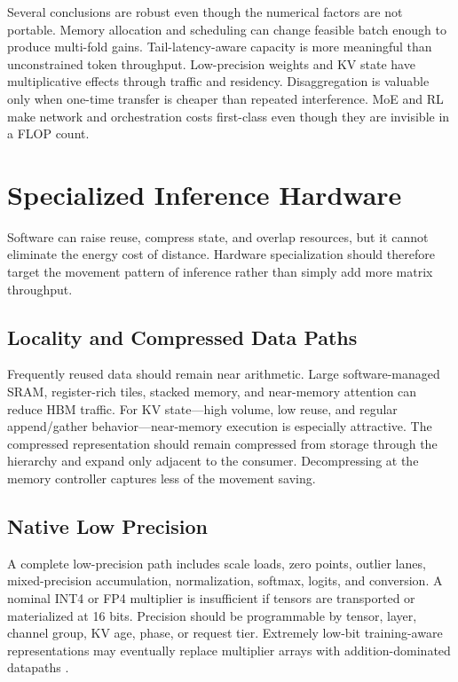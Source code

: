 \documentclass[journal]{IEEEtran}
\begin{document}
Several conclusions are robust even though the numerical factors are not portable. Memory allocation and scheduling can change feasible batch enough to produce multi-fold gains. Tail-latency-aware capacity is more meaningful than unconstrained token throughput. Low-precision weights and KV state have multiplicative effects through traffic and residency. Disaggregation is valuable only when one-time transfer is cheaper than repeated interference. MoE and RL make network and orchestration costs first-class even though they are invisible in a FLOP count.

\section{Specialized Inference Hardware}
Software can raise reuse, compress state, and overlap resources, but it cannot eliminate the energy cost of distance. Hardware specialization should therefore target the movement pattern of inference rather than simply add more matrix throughput.

\subsection{Locality and Compressed Data Paths}
Frequently reused data should remain near arithmetic. Large software-managed SRAM, register-rich tiles, stacked memory, and near-memory attention can reduce HBM traffic. For KV state---high volume, low reuse, and regular append/gather behavior---near-memory execution is especially attractive. The compressed representation should remain compressed from storage through the hierarchy and expand only adjacent to the consumer. Decompressing at the memory controller captures less of the movement saving.

\subsection{Native Low Precision}
A complete low-precision path includes scale loads, zero points, outlier lanes, mixed-precision accumulation, normalization, softmax, logits, and conversion. A nominal INT4 or FP4 multiplier is insufficient if tensors are transported or materialized at 16 bits. Precision should be programmable by tensor, layer, channel group, KV age, phase, or request tier. Extremely low-bit training-aware representations may eventually replace multiplier arrays with addition-dominated datapaths \cite{ma2024bitnet}.
\end{document}
